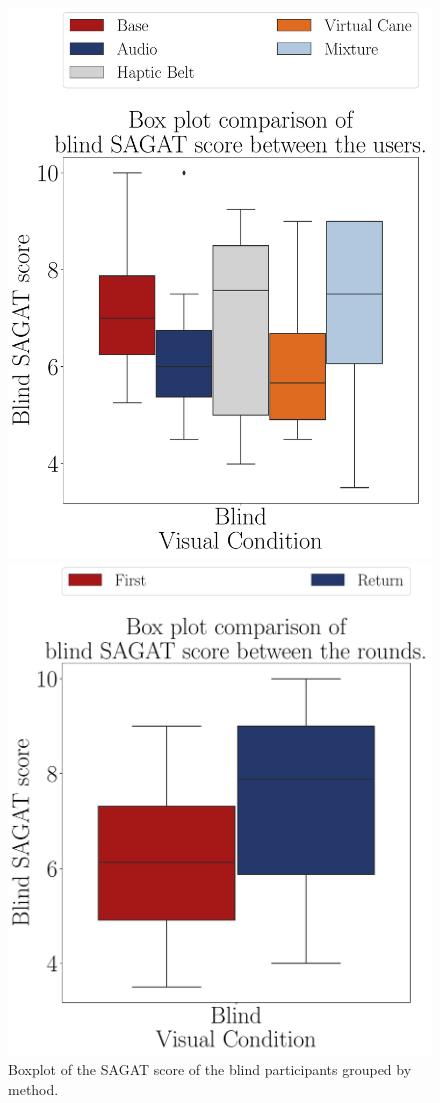 \begin{figure}[!htb]
    \centering
    \begin{minipage}{0.45\textwidth}
        \centering
        \includegraphics[width = 0.8\linewidth]{Resultados/Sagat/Figuras/pdf/boxplot_sagat_blind_scene.pdf}
        \caption{Boxplot of the SAGAT score of the blind participants grouped by method.}
        \label{fig:boxplot_sagat_blind_scene}
    \end{minipage}
    \begin{minipage}{0.075\textwidth}
        \hfill
    \end{minipage}
    \begin{minipage}{0.45\textwidth}
        \centering
        \includegraphics[width = 0.8\linewidth]{Resultados/Sagat/Figuras/pdf/boxplot_sagat_blind_rounds.pdf}

\end{minipage}
\end{figure}
